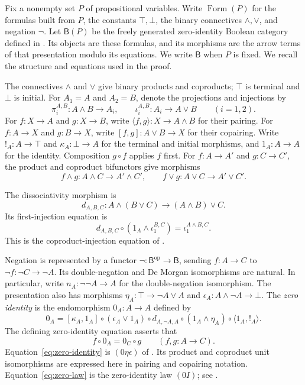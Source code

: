 \documentclass[11pt]{article}
\newcommand{\B}{\mathsf B}
\newcommand{\FormulaSet}{\operatorname{Form}}
\begin{document}
Fix a nonempty set $P$ of propositional variables. Write $\FormulaSet(P)$
for the formulas built from $P$, the constants $\top,\bot$, the binary
connectives $\wedge,\vee$, and negation $\neg$. Let $\B(P)$ be the
freely generated zero-identity Boolean category defined in
\cite[\S\S14.2--14.3]{DP}. Its objects are these formulas, and its
morphisms are the arrow terms of that presentation modulo its equations.
We write $\B$ when $P$ is fixed. We recall the structure and equations
used in the proof.

The connectives $\wedge$ and $\vee$ give binary products and coproducts;
$\top$ is terminal and $\bot$ is initial. For $A_1=A$ and $A_2=B$,
denote the projections and injections by
\[
 \pi_i^{A,B}:A\wedge B\longrightarrow A_i,
 \qquad
 \iota_i^{A,B}:A_i\longrightarrow A\vee B
 \qquad(i=1,2).
\]
For $f:X\to A$ and $g:X\to B$, write
$\langle f,g\rangle:X\to A\wedge B$ for their pairing.
For $f:A\to X$ and $g:B\to X$, write
$[f,g]:A\vee B\to X$ for their copairing. Write
$!_A:A\to\top$ and $\kappa_A:\bot\to A$ for the terminal and initial
morphisms, and $1_A:A\to A$ for the identity. Composition $g\circ f$
applies $f$ first. For $f:A\to A'$ and $g:C\to C'$, the product and
coproduct bifunctors give morphisms
\[
 f\wedge g:A\wedge C\longrightarrow A'\wedge C',
 \qquad f\vee g:A\vee C\longrightarrow A'\vee C'.
\]

The dissociativity morphism is
\[
 d_{A,B,C}:A\wedge(B\vee C)\longrightarrow(A\wedge B)\vee C.
\]
Its first-injection equation is
\begin{equation}
 d_{A,B,C}\circ(1_A\wedge\iota_1^{B,C})
   =\iota_1^{A\wedge B,C}.
 \label{eq:first-injection}
\end{equation}
This is the coproduct-injection equation of
\cite[\S11.1, p.~234]{DP}.

Negation is represented by a functor
$\neg:\B^{\mathrm{op}}\to\B$, sending $f:A\to C$ to
$\neg f:\neg C\to\neg A$. Its double-negation and De Morgan
isomorphisms are natural. In particular, write
$n_A:\neg\neg A\to A$ for the double-negation isomorphism.
The presentation also has morphisms
$\eta_A:\top\to\neg A\vee A$ and
$\epsilon_A:A\wedge\neg A\to\bot$.
The \emph{zero identity} is the endomorphism $0_A:A\to A$ defined by
\begin{equation}
 0_A=[\kappa_A,1_A]\circ(\epsilon_A\vee1_A)\circ d_{A,\neg A,A}
     \circ(1_A\wedge\eta_A)\circ\langle1_A,!_A\rangle.
 \label{eq:zero-identity}
\end{equation}
The defining zero-identity equation asserts that
\begin{equation}
 f\circ0_A=0_C\circ g
 \qquad(f,g:A\to C).
 \label{eq:zero-law}
\end{equation}
Equation~\eqref{eq:zero-identity} is $(0\eta\epsilon)$ of
\cite[\S14.2, p.~317]{DP}. Its product and coproduct unit isomorphisms
are expressed here in pairing and copairing notation.
Equation~\eqref{eq:zero-law} is the zero-identity law $(0I)$;
see \cite[\S14.3, p.~322]{DP}.
\end{document}
